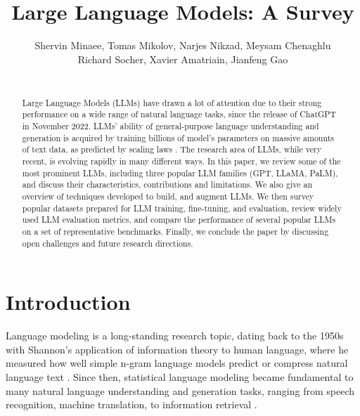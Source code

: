 \documentclass[conference]{IEEEtran}
\begin{document}
\title{Large Language Models: A Survey}


\author{Shervin Minaee, Tomas Mikolov, Narjes Nikzad, Meysam Chenaghlu \\ 
Richard Socher, Xavier Amatriain, Jianfeng Gao \\ \\
}

\maketitle



\begin{abstract}
Large Language Models (LLMs) have drawn a lot of attention due to their strong performance on a wide range of natural language tasks, since the release of ChatGPT in November 2022. 
LLMs' ability of general-purpose language understanding and generation is acquired by training billions of model's parameters on massive amounts of text data, as predicted by scaling laws \cite{kaplan2020scaling,hoffmann2022training}.
The research area of LLMs, while very recent, is evolving rapidly in many different ways.
In this paper, we review some of the most prominent LLMs, including three popular LLM families (GPT, LLaMA, PaLM), and discuss their characteristics, contributions and limitations. 
We also give an overview of techniques developed to build, and augment LLMs.
We then survey popular datasets prepared for LLM training, fine-tuning, and evaluation, review widely used LLM evaluation metrics, and compare the performance of several popular LLMs on a set of representative benchmarks. 
Finally, we conclude the paper by discussing open challenges and future research directions.
\end{abstract}


%

\section{Introduction}
Language modeling is a long-standing research topic, dating back to the 1950s with Shannon's application of information theory to human language, where he measured how well simple n-gram language models predict or compress natural language text \cite{shannon1951prediction}. 
Since then, statistical language modeling became fundamental to many natural language understanding and generation tasks, ranging from speech recognition, machine translation, to information retrieval \cite{jelinek1998statistical,manning1999foundations,manning2009introduction}.
\end{document}
